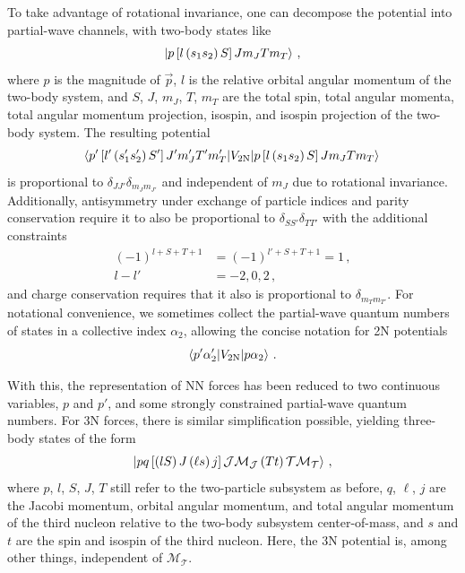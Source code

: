 To take advantage of rotational invariance, one can decompose the potential into partial-wave channels,
with two-body states like
\begin{equation}
  \ket{p \left[l \left(s_1 s_2 \right) S \right] J m_{J} T m_{T}}\,,
\end{equation}
where $p$ is the magnitude of $\vec{p}$,
$l$ is the relative orbital angular momentum of the two-body system,
and $S$, $J$, $m_J$, $T$, $m_{T}$ are the
total spin, total angular momenta, total angular momentum projection, isospin, and isospin projection
of the two-body system.
The resulting potential
\begin{equation}
  \braket{p' \left[l' \left(s_{1}^{\prime} s_{2}^{\prime} \right) S' \right] J' m_{J}^{\prime} T' m_{T}^{\prime}
    | V_{2\text{N}} |
    p \left[l \left(s_{1} s_{2} \right) S \right] J m_{J} T m_{T}
  }\,
\end{equation}
is proportional to $\delta_{JJ'}\delta_{m_J m_{J'}}$ and independent of $m_J$ due to rotational invariance.
Additionally, antisymmetry under exchange of particle indices and parity conservation require
it to also be proportional to $\delta_{S S'} \delta_{T T'}$ with the additional constraints
\begin{align}
  {(-1)}^{l + S + T + 1} & = {(-1)}^{l' + S + T + 1} = 1\,, \\
  l - l' &= -2, 0, 2\,,
\end{align}
and charge conservation requires that it also is proportional to $\delta_{m_T m_{T'}}$.
For notational convenience, we sometimes collect the partial-wave quantum numbers of states
in a collective index $\alpha_2$,
allowing the concise notation for 2N potentials
\begin{equation}
  \braket{p' \alpha_{2}^{\prime}|V_{2\text{N}}| p \alpha_2}\,.
\end{equation}

With this, the representation of NN forces has been reduced to two continuous variables, $p$ and $p'$,
and some strongly constrained partial-wave quantum numbers.
For 3N forces, there is similar simplification possible, yielding three-body states of the form
\begin{equation}
  \ket{p q \left[\left(l S\right) J \left(\ell s\right) j\right] \mathcal{J} \mathcal{M}_{\mathcal{J}} \left(T t\right) \mathcal{T} \mathcal{M}_{\mathcal{T}}}\,,
\end{equation}
where $p$, $l$, $S$, $J$, $T$ still refer to the two-particle subsystem as before,
$q$, $\ell$, $j$ are the Jacobi momentum, orbital angular momentum, and total angular momentum of the third nucleon
relative to the two-body subsystem center-of-mass,
and $s$ and $t$ are the spin and isospin of the third nucleon.
Here, the 3N potential is, among other things, independent of $\mathcal{M}_{\mathcal{T}}$.

